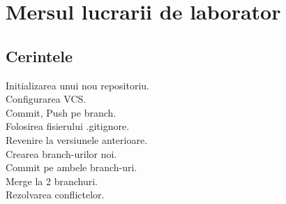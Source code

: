 \section{Mersul lucrarii de laborator}

\subsection{Cerintele}

Initializarea unui nou repositoriu.\\
Configurarea VCS.\\
Commit, Push pe branch.\\
Folosirea fisierului .gitignore.\\
Revenire la versiunele anterioare.\\
Crearea branch-urilor noi.\\
Commit pe ambele branch-uri.\\
Merge la 2 branchuri.\\
Rezolvarea conflictelor.\\

